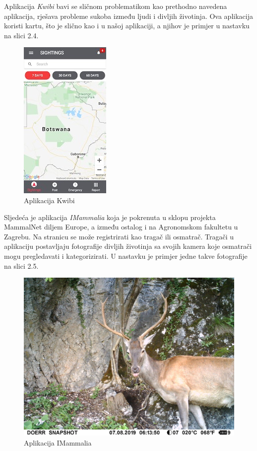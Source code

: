 		Aplikacija \textit{Kwibi} bavi se sličnom problematikom kao prethodno navedena aplikacija, rješava probleme sukoba između ljudi i divljih životinja. Ova aplikacija koristi kartu, što je slično kao i u našoj aplikaciji, a njihov je primjer u nastavku na slici 2.4.
		
		\begin{figure}[H]
			\includegraphics[scale=0.75]{slike/primjera2.JPG} %
			\centering
			\caption{Aplikacija Kwibi}
			\label{fig:kwibi} %
		\end{figure}
		
		Sljedeća je aplikacija \textit{IMammalia} koja je pokrenuta u sklopu projekta MammalNet diljem Europe, a između ostalog i na Agronomskom fakultetu u Zagrebu. Na stranicu se može registrirati kao tragač ili osmatrač. Tragači u aplikaciju postavljaju fotografije divljih životinja sa svojih kamera koje osmatrači mogu pregledavati i kategorizirati. U nastavku je primjer jedne takve fotografije na slici 2.5.
		
		\begin{figure}[H]
			\includegraphics[scale=0.75]{slike/primjera3.JPG} %
			\centering
			\caption{Aplikacija IMammalia}
			\label{fig:mammal} %
		\end{figure}
		
